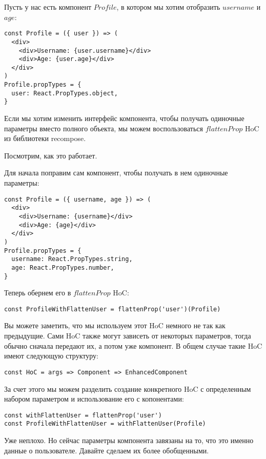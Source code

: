 Пусть у нас есть компонент $Profile$, в котором мы хотим отобразить $username$ и $age$:

\begin{lstlisting}
const Profile = ({ user }) => (
  <div>
    <div>Username: {user.username}</div>
    <div>Age: {user.age}</div>
  </div>
)
Profile.propTypes = {
  user: React.PropTypes.object,
}
\end{lstlisting}

Если мы хотим изменить интерфейс компонента, чтобы получать одиночные параметры вместо полного объекта, мы можем воспользоваться $flattenProp$ HoC из библиотеки recompose.

Посмотрим, как это работает.

Для начала поправим сам компонент, чтобы получать в нем одиночные параметры:

\begin{lstlisting}
const Profile = ({ username, age }) => (
  <div>
    <div>Username: {username}</div>
    <div>Age: {age}</div>
  </div>
)
Profile.propTypes = {
  username: React.PropTypes.string,
  age: React.PropTypes.number,
}
\end{lstlisting}

Теперь обернем его в $flattenProp$ HoC:

\begin{lstlisting}
const ProfileWithFlattenUser = flattenProp('user')(Profile)
\end{lstlisting}

Вы можете заметить, что мы используем этот HoC немного не так как предыдущие. Сами HoC также могут зависеть от некоторых параметров, тогда обычно сначала передают их, а потом уже компонент. В общем случае такие HoC имеют следующую структуру:

\begin{lstlisting}
const HoC = args => Component => EnhancedComponent
\end{lstlisting}

За счет этого мы можем разделить создание конкретного HoC с определенным набором параметром и использование его с копонентами:

\begin{lstlisting}
const withFlattenUser = flattenProp('user')
const ProfileWithFlattenUser = withFlattenUser(Profile)
\end{lstlisting}

Уже неплохо. Но сейчас параметры компонента завязаны на то, что это именно данные о пользователе. Давайте сделаем их более обобщенными.

